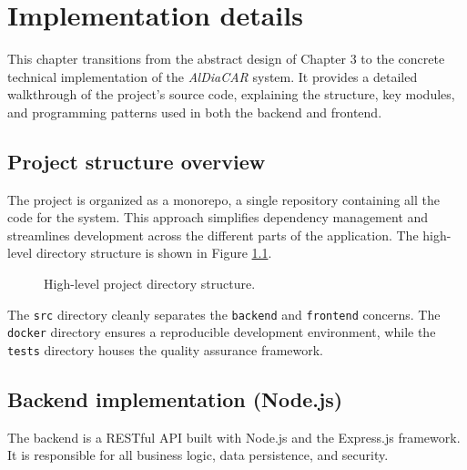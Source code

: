 \chapter{Implementation details}

This chapter transitions from the abstract design of Chapter 3 to the concrete technical implementation of the \textit{AlDiaCAR} system. It provides a detailed walkthrough of the project's source code, explaining the structure, key modules, and programming patterns used in both the backend and frontend.

\section{Project structure overview}

The project is organized as a monorepo, a single repository containing all the code for the system. This approach simplifies dependency management and streamlines development across the different parts of the application. The high-level directory structure is shown in Figure \ref{fig:dirtree}.

\begin{figure}[h!]
\caption{High-level project directory structure.}
\label{fig:dirtree}
\end{figure}

The \texttt{src} directory cleanly separates the \texttt{backend} and \texttt{frontend} concerns. The \texttt{docker} directory ensures a reproducible development environment, while the \texttt{tests} directory houses the quality assurance framework.

\section{Backend implementation (Node.js)}

The backend is a RESTful API built with Node.js and the Express.js framework. It is responsible for all business logic, data persistence, and security.

